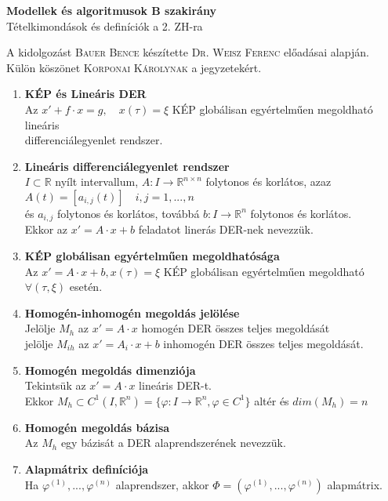 \documentclass{article}
\begin{document}
\renewcommand{\labelitemi}{\textbullet}
\def\R{\mathbb{R}}
\def\N{\mathbb{N}}
\def\br{\\[0.1cm]}
\def\egorbenyil{\text{  }e\hookrightarrow}
\begin{center}
	{\Large\textbf{Modellek és algoritmusok B szakirány}}\\[0.2cm]
	Tételkimondások és definíciók a 2. ZH-ra
\end{center}
{\small A kidolgozást \textsc{Bauer Bence} készítette \textsc{Dr. Weisz Ferenc} előadásai alapján.}\\
{\footnotesize Külön köszönet \textsc{Korponai Károlynak} a jegyzetekért.}

\begin{enumerate}
	\item\textbf{KÉP és Lineáris DER}\br
	Az $x'+f\cdot x=g,\quad x(\tau)=\xi$ KÉP globálisan egyértelműen megoldható lineáris\br
	differenciálegyenlet rendszer.
	
	\item\textbf{Lineáris differenciálegyenlet rendszer}\br
	$I\subset\R$ nyílt intervallum, $A:I\rightarrow\R^{n\times n}$ folytonos és korlátos,
	azaz $A(t)=[a_{i,j}(t)]\quad i,j=1,...,n$\br
	és $a_{i,j}$ folytonos és korlátos, továbbá $b:I\rightarrow\R^n$ folytonos és korlátos.\br
	Ekkor az $x'=A\cdot x+b$ feladatot linerás DER-nek nevezzük.
	
	\item\textbf{KÉP globálisan egyértelműen megoldhatósága}\br
	Az $x'=A\cdot x+b, x(\tau)=\xi$ KÉP globálisan egyértelműen megoldható
	$\forall(\tau, \xi)$ esetén.
	
	\item\textbf{Homogén-inhomogén megoldás jelölése}\br
	Jelölje $M_h$ az $x'=A\cdot x$ homogén DER összes teljes megoldását\br
	jelölje $M_{ih}$ az $x'=A_i\cdot x+b$ inhomogén DER összes teljes megoldását.
	
	\item\textbf{Homogén megoldás dimenziója}\br
	Tekintsük az $x'=A\cdot x$ lineáris DER-t.\br
	Ekkor $M_h\subset C^1(I, \R^n)=\{\varphi:I\rightarrow\R^n,\varphi\in C^1\}$ altér és
	$dim(M_h)=n$
	
	\item\textbf{Homogén megoldás bázisa}\br
	Az $M_h$ egy bázisát a DER alaprendszerének nevezzük.
	
	\item\textbf{Alapmátrix definíciója}\br
	Ha $\varphi^{(1)},...,\varphi^{(n)}$ alaprendszer, akkor $\Phi=
	(\varphi^{(1)},...,\varphi^{(n)})$ alapmátrix.
	

\end{enumerate}
\end{document}
